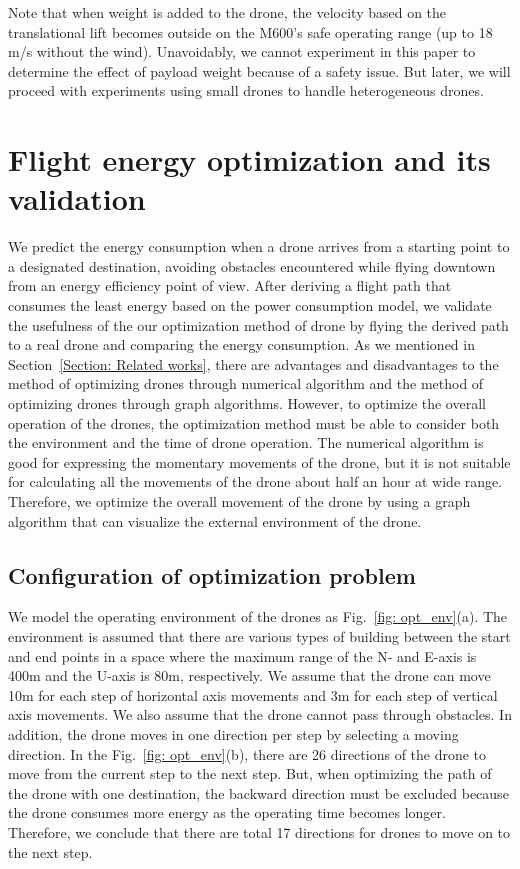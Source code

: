 \documentclass[journal]{./template/IEEEtran}
\begin{document}
Note that when weight is added to the drone, the velocity based on the translational lift becomes outside on the M600's safe operating range (up to 18 m/s without the wind). Unavoidably, we cannot experiment in this paper to determine the effect of payload weight because of a safety issue. But later, we will proceed with experiments using small drones to handle heterogeneous drones.










\section{Flight energy optimization and its validation}

We predict the energy consumption when a drone arrives from a starting point to a designated destination, avoiding obstacles encountered while flying downtown from an energy efficiency point of view. After deriving a flight path that consumes the least energy based on the power consumption model, we validate the usefulness of the our optimization method of drone by flying the derived path to a real drone and comparing the energy consumption.
As we mentioned in Section~\ref{Section: Related works}, there are advantages and disadvantages to the method of optimizing drones through numerical algorithm and the method of optimizing drones through graph algorithms.
However, to optimize the overall operation of the drones, the optimization method must be able to consider both the environment and the time of drone operation. 
The numerical algorithm is good for expressing the momentary movements of the drone, but it is not suitable for calculating all the movements of the drone about half an hour at wide range.
Therefore, we optimize the overall movement of the drone by using a graph algorithm that can visualize the external environment of the drone.





\subsection{Configuration of optimization problem}

We model the operating environment of the drones as Fig.~\ref{fig: opt_env}(a).
The environment is assumed that there are various types of building between the start and end points in a space where the maximum range of the N- and E-axis is 400m and the U-axis is 80m, respectively.
We assume that the drone can move 10m for each step of horizontal axis movements and 3m for each step of vertical axis movements. We also assume that the drone cannot pass through obstacles. In addition, the drone moves in one direction per step by selecting a moving direction.
In the Fig.~\ref{fig: opt_env}(b), there are 26 directions of the drone to move from the current step to the next step.
But, when optimizing the path of the drone with one destination, the backward direction must be excluded because the drone consumes more energy as the operating time becomes longer. Therefore, we conclude that there are total 17 directions for drones to move on to the next step.
\end{document}
